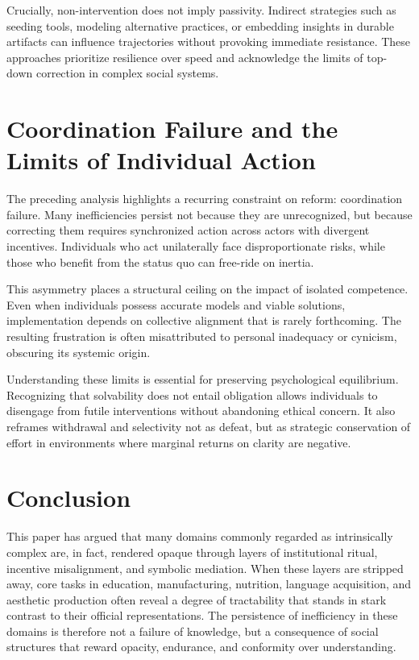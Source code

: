 \documentclass[12pt]{article}
\begin{document}
Crucially, non-intervention does not imply passivity. Indirect strategies such as seeding tools, modeling alternative practices, or embedding insights in durable artifacts can influence trajectories without provoking immediate resistance. These approaches prioritize resilience over speed and acknowledge the limits of top-down correction in complex social systems.

\section{Coordination Failure and the Limits of Individual Action}

The preceding analysis highlights a recurring constraint on reform: coordination failure. Many inefficiencies persist not because they are unrecognized, but because correcting them requires synchronized action across actors with divergent incentives. Individuals who act unilaterally face disproportionate risks, while those who benefit from the status quo can free-ride on inertia.

This asymmetry places a structural ceiling on the impact of isolated competence. Even when individuals possess accurate models and viable solutions, implementation depends on collective alignment that is rarely forthcoming. The resulting frustration is often misattributed to personal inadequacy or cynicism, obscuring its systemic origin.

Understanding these limits is essential for preserving psychological equilibrium. Recognizing that solvability does not entail obligation allows individuals to disengage from futile interventions without abandoning ethical concern. It also reframes withdrawal and selectivity not as defeat, but as strategic conservation of effort in environments where marginal returns on clarity are negative.

\section{Conclusion}

This paper has argued that many domains commonly regarded as intrinsically complex are, in fact, rendered opaque through layers of institutional ritual, incentive misalignment, and symbolic mediation. When these layers are stripped away, core tasks in education, manufacturing, nutrition, language acquisition, and aesthetic production often reveal a degree of tractability that stands in stark contrast to their official representations. The persistence of inefficiency in these domains is therefore not a failure of knowledge, but a consequence of social structures that reward opacity, endurance, and conformity over understanding.
\end{document}
